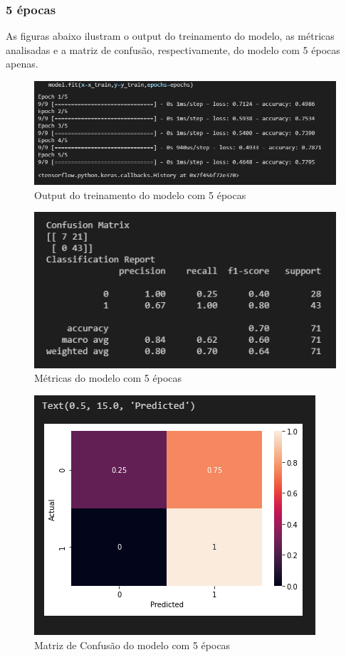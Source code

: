 \documentclass[12pt]{article}
\begin{document}
\subsubsection{5 épocas}

As figuras abaixo ilustram o output do treinamento do modelo, as métricas analisadas e a matriz de confusão, respectivamente, do modelo com 5 épocas apenas.

\begin{figure}[H]
	\centering
	\includegraphics[width=0.7\linewidth]{Imagens/5epocas/fit5epocas}
	\caption{Output do treinamento do modelo com 5 épocas}
	\label{fig:fit5epocas}
\end{figure}
\begin{figure}[H]
	\centering
	\includegraphics[width=0.7\linewidth]{Imagens/5epocas/metricas5epocas}
	\caption{Métricas do modelo com 5 épocas}
	\label{fig:metricas5epocas}
\end{figure}
\begin{figure}[H]
	\centering
	\includegraphics[width=0.7\linewidth]{Imagens/5epocas/confusao5epocas}
	\caption{Matriz de Confusão do modelo com 5 épocas}
	\label{fig:confusao5epocas}
\end{figure}
\end{document}
